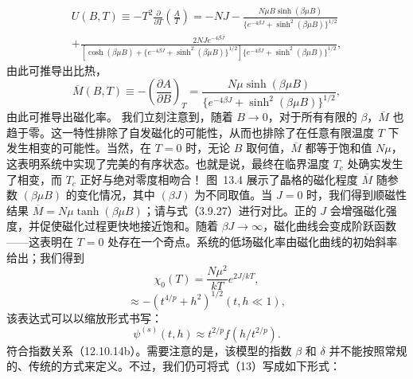 \begin{equation}\tag{13.1.29}\label{eq:13.1.29}
\begin{array}{r} { U ( B , T ) \equiv - T ^{2} \frac { \partial } { \partial T } \left( \frac { A } { T } \right) = - N J - \frac { N \mu B \sinh ( \beta \mu B ) } { \{ e ^{- 4 \beta J} + \sinh ^{2} ( \beta \mu B ) \} ^{1 / 2} } } \\{ + \frac { 2 N J e ^{- 4 \beta J} } { [ \cosh ( \beta \mu B ) + \{ e ^{- 4 \beta J} + \sinh ^{2} ( \beta \mu B ) \} ^{1 / 2} ] \{ e ^{- 4 \beta J} + \sinh ^{2} ( \beta \mu B ) \} ^{1 / 2} } , } \end{array}
\end{equation}
由此可推导出比热，
\begin{equation}\tag{13.1.30}\label{eq:13.1.30}
\overline { { M } } ( B , T ) \equiv - \left( \frac { \partial A } { \partial B } \right) _ { T } = \frac { N \mu \sinh ( \beta \mu B ) } { \{ e ^{- 4 \beta J} + \sinh ^{2} ( \beta \mu B ) \} ^{1 / 2} } ,
\end{equation}
由此可推导出磁化率。
我们立刻注意到，随着 \(B \to 0\)，对于所有有限的 \(\beta\)，\(\overline{M}\) 也趋于零。这一特性排除了自发磁化的可能性，从而也排除了在任意有限温度 \(T\) 下发生相变的可能性。当然，在 \(T=0\) 时，无论 \(B\) 取何值，\(\overline{M}\) 都等于饱和值 \(N\mu\)，这表明系统中实现了完美的有序状态。也就是说，最终在临界温度 \(T_c\) 处确实发生了相变，而 \(T_c\) 正好与绝对零度相吻合！
图~13.4 展示了晶格的磁化程度 \(\overline{M}\) 随参数 \((\beta\mu B)\) 的变化情况，其中 \((\beta J)\) 为不同取值。当 \(J=0\) 时，我们得到顺磁性结果 \(\overline{M}=N\mu\tanh(\beta\mu B)\)；请与式（3.9.27）进行对比。正的 \(J\) 会增强磁化强度，并促使磁化过程更快地接近饱和。随着 \(\beta J \to \infty\)，磁化曲线会变成阶跃函数——这表明在 \(T=0\) 处存在一个奇点。系统的低场磁化率由磁化曲线的初始斜率给出；我们得到
\begin{equation}\tag{13.1.31}\label{eq:13.1.31}
\chi _ { 0 } ( T ) = \frac { N \mu ^{2} } { k T } e ^{2 J / k T} ,
\end{equation}
\begin{equation}\tag{13.1.32}\label{eq:13.1.32}
\approx - ( t ^{4 / p} + h ^{2} ) ^{1 / 2}  ( t , h \ll 1 ) ,
\end{equation}
该表达式可以以缩放形式书写：
\begin{equation}\tag{13.1.33}\label{eq:13.1.33}
\psi ^{( s )} ( t , h ) \approx t ^{2 / p} f ( h / t ^{2 / p} ) .
\end{equation}
符合指数关系（12.10.14b）。需要注意的是，该模型的指数 \(\beta\) 和 \(\delta\) 并不能按照常规的、传统的方式来定义。不过，我们仍可将式（13）写成如下形式：
